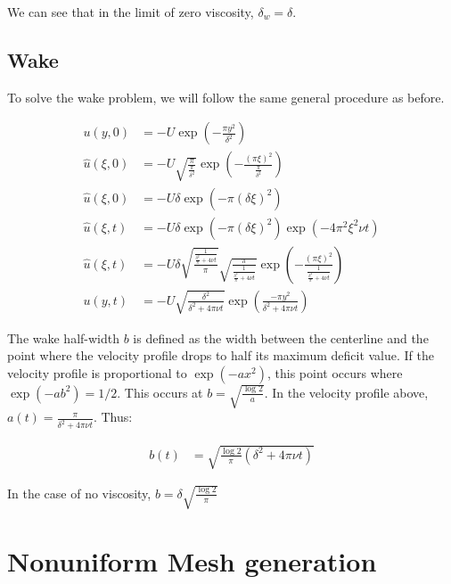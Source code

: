 \documentclass{article}
\begin{document}
We can see that in the limit of zero viscosity, $\delta_w = \delta$.

\subsection{Wake}

To solve the wake problem, we will follow the same general procedure
	as before.

\begin{align}
u(y,0) & = -U\exp\left(-\frac{\pi y^2}{\delta^2} \right)\\
\hat{u}(\xi, 0) & = - U \sqrt{ \frac{\pi}{\frac{\pi}{\delta^2}}}
	\exp \left( - \frac{ (\pi \xi)^2}{ \frac{\pi}{\delta^2}} \right)
	\nonumber \\
\hat{u}(\xi, 0)& = - U \delta \exp \left( - 
	\pi \left( \delta \xi \right)^2 \right) \\	
\hat{u}(\xi, t) & = - U \delta 
	\exp \left( - \pi \left( \delta \xi \right)^2 \right)
	\exp \left( - 4 \pi^2 \xi^2 \nu t \right) \nonumber\\
\hat{u}(\xi, t) & = - U \delta
	\sqrt{ \frac{\frac{1}{ \frac{\delta^2}{\pi} + 4 \nu t}}{\pi}}
	\sqrt{ \frac{\pi}{ \frac{1}{ \frac{\delta^2}{\pi} + 4 \nu t}}}
	\exp \left( - \frac{ ( \pi \xi )^2}
	{ \frac{1}{ \frac{\delta^2}{\pi} + 4 \nu t}} \right) \nonumber\\
u(y, t) & = - U \sqrt{ \frac{\delta^2}{ \delta^2 + 4 \pi \nu t}}
	\exp \left( \frac{-\pi y^2}{ \delta^2 + 4 \pi \nu t} \right)
\end{align}

The wake half-width $b$ is defined as the width between the centerline
	and the point where the velocity profile drops to half its
	maximum deficit value.
If the velocity profile is proportional to $\exp(-a x^2)$, this point occurs
	where $\exp(-a b^2) = 1/2$.  
This occurs at $b = \sqrt{\frac{\log 2}{a}}$.
In the velocity profile above, $a(t) = \frac{\pi}{\delta^2 + 4 \pi \nu t}$.
Thus:

\begin{align}
b(t) & = \sqrt{ \frac{ \log 2}{\pi} \left( \delta^2 + 4 \pi \nu t \right) }
\end{align}

In the case of no viscosity, $b = \delta \sqrt{\frac{\log 2}{\pi}}$


\section{ Nonuniform Mesh generation}
\end{document}
